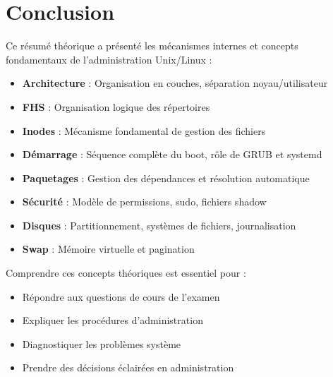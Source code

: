 \documentclass[12pt,a4paper]{article}
\begin{document}

\section*{Conclusion}

Ce résumé théorique a présenté les mécanismes internes et concepts fondamentaux de l'administration Unix/Linux :

\begin{itemize}
    \item \textbf{Architecture} : Organisation en couches, séparation noyau/utilisateur
    \item \textbf{FHS} : Organisation logique des répertoires
    \item \textbf{Inodes} : Mécanisme fondamental de gestion des fichiers
    \item \textbf{Démarrage} : Séquence complète du boot, rôle de GRUB et systemd
    \item \textbf{Paquetages} : Gestion des dépendances et résolution automatique
    \item \textbf{Sécurité} : Modèle de permissions, sudo, fichiers shadow
    \item \textbf{Disques} : Partitionnement, systèmes de fichiers, journalisation
    \item \textbf{Swap} : Mémoire virtuelle et pagination
\end{itemize}

Comprendre ces concepts théoriques est essentiel pour :
\begin{itemize}
    \item Répondre aux questions de cours de l'examen
    \item Expliquer les procédures d'administration
    \item Diagnostiquer les problèmes système
    \item Prendre des décisions éclairées en administration
\end{itemize}
\end{document}
